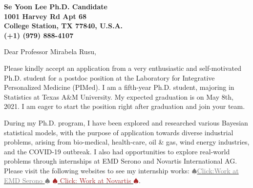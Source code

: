 \documentclass[9pt]{letter} %
\begin{document}

\begin{letter}{
} 


\begin{center}
\large\bf Se Yoon Lee Ph.D. Candidate\\ %
1001 Harvey Rd Apt 68
 \\ College Station, TX 77840, U.S.A.\\(+1) (979) 888-4107%
\end{center} 
\vfill

\signature{Se Yoon Lee} %


\opening{Dear Professor Mirabela Rusu,} 

Please kindly accept an application from a very enthusiastic and self-motivated Ph.D. student for a postdoc position at the Laboratory for Integrative Personalized Medicine (PIMed). I am a fifth-year Ph.D. student, majoring in Statistics at Texas A\&M University. My expected graduation is on May 8th, 2021. I am eager to start the position right after graduation and join your team.

During my Ph.D. program, I have been explored and researched various Bayesian statistical models, with the purpose of application towards diverse industrial problems, arising from bio-medical, health-care, oil \& gas, wind energy industries, and the COVID-19 outbreak. I also had opportunities to explore real-world problems through internships at EMD Serono and Novartis International AG. Please visit the following websites to see my internship works: \href{https://sites.google.com/view/seyoonlee/home/projects/merck-group-summer-internship-project?authuser=0}{\textcolor{gray}{$\spadesuit$Click:Work at EMD Serono $\spadesuit$}}
\href{https://sites.google.com/view/seyoonlee/home/projects/novartis-summer-internship-project?authuser=0#h.dfc3zhswkx8m}{\textcolor{brown}{$\spadesuit$ Click: Work at Novartis $\spadesuit$}}. 


\end{letter}
\end{document}
